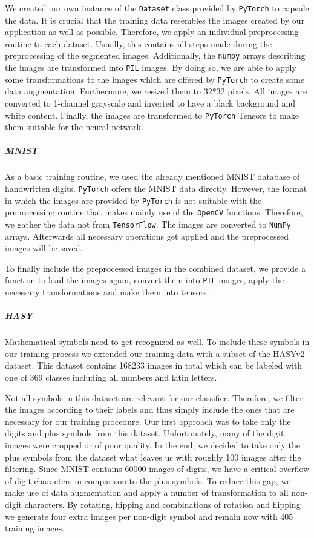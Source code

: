 \documentclass[12pt]{article}
\begin{document}
		We created our own instance of the \texttt{Dataset} class provided by \texttt{PyTorch} to capsule the data. It is crucial that the training data resembles the images created by our application as well as possible. Therefore, we apply an individual preprocessing routine to each dataset. Usually, this contains all steps made during the preprocessing of the segmented images. Additionally, the \texttt{numpy} arrays describing the images are transformed into \texttt{PIL} images. By doing so, we are able to apply some transformations to the images which are offered by \texttt{PyTorch} to create some data augmentation. Furthermore, we resized them to 32*32 pixels. All images are converted to 1-channel grayscale and inverted to have a black background and white content. Finally, the images are transformed to \texttt{PyTorch} Tensors to make them suitable for the neural network. 
		
		\subparagraph{MNIST}
			As a basic training routine, we used the already mentioned MNIST database of handwritten digits. \texttt{PyTorch} offers the MNIST data directly. However, the format in which the images are provided by \texttt{PyTorch} is not suitable with the preprocessing routine that makes mainly use of the \texttt{OpenCV} functions. Therefore, we gather the data not from \texttt{TensorFlow}. The images are converted to \texttt{NumPy} arrays. Afterwards all necessary operations get applied and the preprocessed images will be saved. 
			
			To finally include the preprocessed images in the combined dataset, we provide a function to load the images again, convert them into \texttt{PIL} images, apply the necessary transformations and make them into tensors.
			
		\subparagraph{HASY}
			Mathematical symbols need to get recognized as well. To include these symbols in our training process we extended our training data with a subset of the HASYv2\cite{hasy} dataset. This dataset contains 168233 images in total which can be labeled with one of 369 classes including all numbers and latin letters. 
			
			Not all symbols in this dataset are relevant for our classifier. Therefore, we filter the images according to their labels and thus simply include the ones that are necessary for our training procedure. Our first approach was to take only the digits and plus symbols from this dataset. Unfortunately, many of the digit images were cropped or of poor quality. In the end, we decided to take only the plus symbols from the dataset what leaves us with roughly 100 images after the filtering. Since MNIST contains 60000 images of digits, we have a critical overflow of digit characters in comparison to the plus symbols. To reduce this gap, we make use of data augmentation and apply a number of transformation to all non-digit characters. By rotating, flipping and combinations of rotation and flipping we generate four extra images per non-digit symbol and remain now with 405 training images.
			
\end{document}
